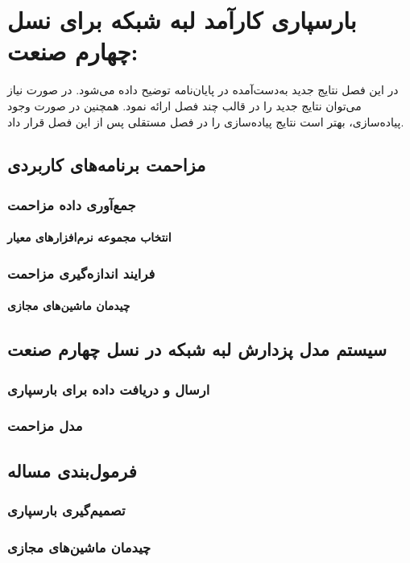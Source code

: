 
\chapter{بارسپاری کارآمد لبه شبکه برای نسل چهارم صنعت:}\label{chap:model}

در این فصل نتایج جدید به‌دست‌آمده در پایان‌نامه توضیح داده می‌شود.
در صورت نیاز می‌توان نتایج جدید را در قالب چند فصل ارائه نمود.
همچنین در صورت وجود پیاده‌سازی، بهتر است نتایج پیاده‌سازی را 
در فصل مستقلی پس از این فصل قرار داد.
\section{مزاحمت برنامه‌های کاربردی}
\subsection{جمع‌آوری داده مزاحمت}
\subsubsection{انتخاب مجموعه نرم‌افزارهای معیار}
\subsection{فرایند اندازه‌گیری مزاحمت}
\subsubsection{چیدمان ماشین‌های مجازی}
\section{سیستم مدل پزدارش لبه شبکه در نسل چهارم صنعت}
\subsection{ارسال و دریافت داده برای بارسپاری}
\subsection{مدل مزاحمت}
\section{فرمول‌بندی مساله}
\subsection{تصمیم‌گیری بارسپاری}
\subsection{چیدمان ماشین‌های مجازی}
